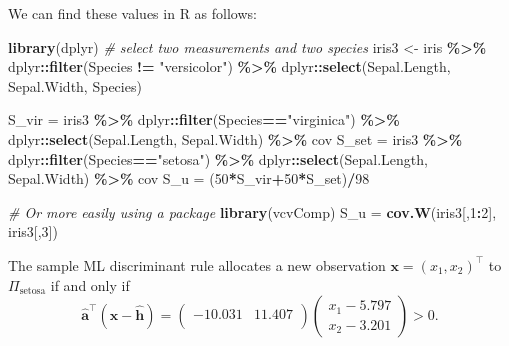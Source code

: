 \documentclass[
]{book}
\newenvironment{Shaded}{\begin{snugshade}}{\end{snugshade}}
\newcommand{\CommentTok}[1]{\textcolor[rgb]{0.56,0.35,0.01}{\textit{#1}}}
\newcommand{\DecValTok}[1]{\textcolor[rgb]{0.00,0.00,0.81}{#1}}
\newcommand{\FunctionTok}[1]{\textcolor[rgb]{0.13,0.29,0.53}{\textbf{#1}}}
\newcommand{\NormalTok}[1]{#1}
\newcommand{\OtherTok}[1]{\textcolor[rgb]{0.56,0.35,0.01}{#1}}
\newcommand{\SpecialCharTok}[1]{\textcolor[rgb]{0.81,0.36,0.00}{\textbf{#1}}}
\newcommand{\StringTok}[1]{\textcolor[rgb]{0.31,0.60,0.02}{#1}}
\theoremstyle{definition}
\theoremstyle{definition}
\theoremstyle{definition}
\theoremstyle{definition}
\theoremstyle{remark}
\begin{document}
We can find these values in R as follows:

\begin{Shaded}
\begin{Highlighting}[]
\FunctionTok{library}\NormalTok{(dplyr)}
\CommentTok{\# select two measurements and two species}
\NormalTok{iris3 }\OtherTok{\textless{}{-}}\NormalTok{ iris }\SpecialCharTok{\%\textgreater{}\%}\NormalTok{ dplyr}\SpecialCharTok{::}\FunctionTok{filter}\NormalTok{(Species }\SpecialCharTok{!=} \StringTok{"versicolor"}\NormalTok{) }\SpecialCharTok{\%\textgreater{}\%}
\NormalTok{  dplyr}\SpecialCharTok{::}\FunctionTok{select}\NormalTok{(Sepal.Length, Sepal.Width, Species)}

\NormalTok{S\_vir }\OtherTok{=}\NormalTok{ iris3 }\SpecialCharTok{\%\textgreater{}\%}\NormalTok{ dplyr}\SpecialCharTok{::}\FunctionTok{filter}\NormalTok{(Species}\SpecialCharTok{==}\StringTok{"virginica"}\NormalTok{) }\SpecialCharTok{\%\textgreater{}\%}
\NormalTok{  dplyr}\SpecialCharTok{::}\FunctionTok{select}\NormalTok{(Sepal.Length, Sepal.Width) }\SpecialCharTok{\%\textgreater{}\%} 
\NormalTok{  cov}
\NormalTok{S\_set }\OtherTok{=}\NormalTok{ iris3 }\SpecialCharTok{\%\textgreater{}\%}\NormalTok{ dplyr}\SpecialCharTok{::}\FunctionTok{filter}\NormalTok{(Species}\SpecialCharTok{==}\StringTok{"setosa"}\NormalTok{) }\SpecialCharTok{\%\textgreater{}\%} 
\NormalTok{  dplyr}\SpecialCharTok{::}\FunctionTok{select}\NormalTok{(Sepal.Length, Sepal.Width) }\SpecialCharTok{\%\textgreater{}\%} 
\NormalTok{  cov}
\NormalTok{S\_u }\OtherTok{=}\NormalTok{ (}\DecValTok{50}\SpecialCharTok{*}\NormalTok{S\_vir}\SpecialCharTok{+}\DecValTok{50}\SpecialCharTok{*}\NormalTok{S\_set)}\SpecialCharTok{/}\DecValTok{98}


\CommentTok{\# Or more easily using a package}
\FunctionTok{library}\NormalTok{(vcvComp)}
\NormalTok{S\_u }\OtherTok{=} \FunctionTok{cov.W}\NormalTok{(iris3[,}\DecValTok{1}\SpecialCharTok{:}\DecValTok{2}\NormalTok{], iris3[,}\DecValTok{3}\NormalTok{]) }
\end{Highlighting}
\end{Shaded}

The sample ML discriminant rule allocates a new observation \(\mathbf x= (x_1, x_2)^\top\) to \(\Pi_{\mbox{setosa}}\) if and only if
\[ \hat{\mathbf a}^\top (\mathbf x- \hat{\mathbf h}) = \begin{pmatrix}-10.031&11.407 \\\end{pmatrix} \begin{pmatrix} x_1 - 5.797 \\ x_2 - 3.201 \end{pmatrix} > 0.\]
\end{document}
